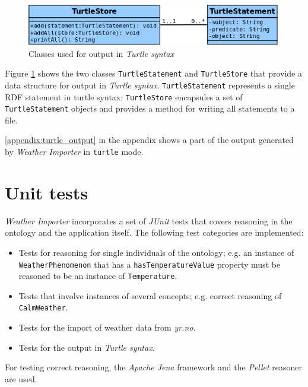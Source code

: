 \begin{figure}
\centering
\includegraphics[width=.7\textwidth]{figures/diagrams/turtlestore.png}
\caption{Classes used for output in \emph{Turtle syntax}}
\label{fig:importer_turtlestore}
\end{figure}

Figure \ref{fig:importer_turtlestore} shows the two classes \texttt{TurtleStatement} and \texttt{TurtleStore} that provide a data structure for output in \emph{Turtle syntax}. \texttt{TurtleStatement} represents a single RDF statement in turtle syntax; \texttt{TurtleStore} encapsules a set of \texttt{TurtleStatement} objects and provides a method for writing all statements to a file.

\ref{appendix:turtle_output} in the appendix shows a part of the output generated by \emph{Weather Importer} in \texttt{turtle} mode.

\section{Unit tests}
\label{sec:importer_tests}

\emph{Weather Importer} incorporates a set of \emph{JUnit} tests that covers reasoning in the \thinkhomeweather ontology and the application itself. The following test categories are implemented:
\begin{itemize}
  \item Tests for reasoning for single individuals of the ontology; e.g. an instance of \texttt{WeatherPhenomenon} that has a \texttt{hasTemperatureValue} property must be reasoned to be an instance of \texttt{Temperature}.
  \item Tests that involve instances of several concepts; e.g. correct reasoning of \texttt{CalmWeather}.
  \item Tests for the import of weather data from \emph{yr.no}.
  \item Tests for the output in \emph{Turtle syntax}.
\end{itemize}


For testing correct reasoning, the \emph{Apache Jena} framework and the \emph{Pellet} reasoner are used.

